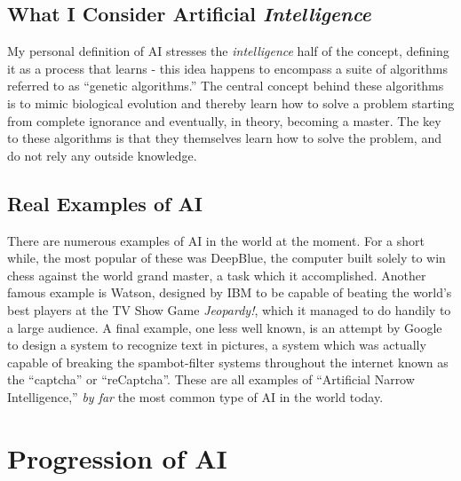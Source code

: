 \documentclass[12pt]{article} %
\begin{document}

\subsection{What I Consider Artificial \textit{Intelligence}}

My personal definition of AI stresses the \textit{intelligence} half of the concept, defining it as a process that learns - this idea happens to encompass a suite of algorithms referred to as ``genetic algorithms.'' The central concept behind these algorithms is to mimic biological evolution and thereby learn how to solve a problem starting from complete ignorance and eventually, in theory, becoming a master. The key to these algorithms is that they themselves learn how to solve the problem, and do not rely any outside knowledge.


\subsection{Real Examples of AI}

There are numerous examples of AI in the world at the moment. For a short while, the most popular of these was DeepBlue, the computer built solely to win chess against the world grand master, a task which it accomplished\cite{deepblue}. Another famous example is Watson, designed by IBM to be capable of beating the world's best players at the TV Show Game \textit{Jeopardy!}\cite{watson}, which it managed to do handily to a large audience\cite{watsonwins}. A final example, one less well known, is an attempt by Google to design a system to recognize text in pictures, a system which was actually capable of breaking the spambot-filter systems throughout the internet known as the ``captcha'' or ``reCaptcha''. These are all examples of ``Artificial Narrow Intelligence,'' \textit{by far} the most common type of AI in the world today.


\section{Progression of AI}
\end{document}
